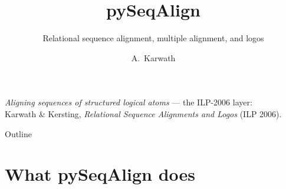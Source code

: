 \documentclass[aspectratio=169,10pt]{beamer}
\title[pySeqAlign]{\textbf{pySeqAlign}}
\subtitle{Relational sequence alignment, multiple alignment, and logos}
\author{A.\ Karwath}
\institute{\small github.com/athro/pySeqAlign \quad$\cdot$\quad PyPI: \texttt{pyseqalignment}}
\date{}
\begin{document}
{
\begin{frame}[plain]
  \titlepage
  \begin{center}\small
  \emph{Aligning sequences of structured logical atoms} --- the ILP-2006 layer:\\
  Karwath \& Kersting, \textit{Relational Sequence Alignments and Logos} (ILP 2006).
  \end{center}
\end{frame}}

\begin{frame}{Outline}
  \tableofcontents
\end{frame}

\section{What pySeqAlign does}
\end{document}

